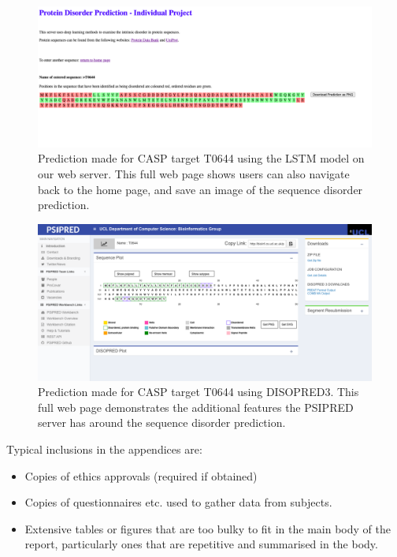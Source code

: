 \documentclass{l4proj}
\begin{document}
\begin{appendices}
\begin{figure}[!htb]
    \centering
    \includegraphics[width=\linewidth]{images/web_eval/mypredCasp.pdf}

    \caption{Prediction made for CASP target T0644 using the LSTM model on our web server. This full web page shows users can also navigate back to the home page, and save an image of the sequence disorder prediction.}

    \label{fig:fullmypred} 
\end{figure}


\begin{figure}[!htb]
    \centering
    \includegraphics[width=\linewidth]{images/web_eval/DISOPREDCasp.pdf}

    \caption{Prediction made for CASP target T0644 using DISOPRED3. This full web page demonstrates the additional features the PSIPRED server has around the sequence disorder prediction.}

    \label{fig:sequence example} 
\end{figure}




\newpage
Typical inclusions in the appendices are:

\begin{itemize}
\item
  Copies of ethics approvals (required if obtained)
\item
  Copies of questionnaires etc. used to gather data from subjects.
\item
  Extensive tables or figures that are too bulky to fit in the main body of
  the report, particularly ones that are repetitive and summarised in the body.


\end{itemize}
\end{appendices}
\end{document}

